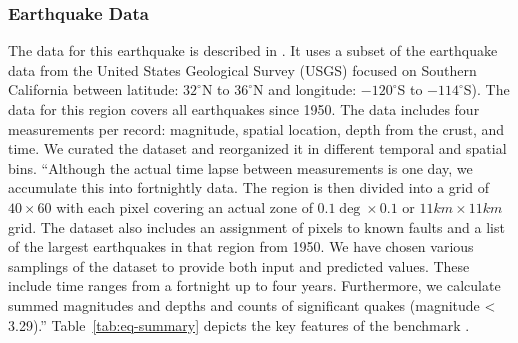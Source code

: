 \documentclass[utf8]{FrontiersinVancouver} %
\begin{document}
\subsubsection{Earthquake Data}

The data for this earthquake is described in
\citep{las-22-mlcommons-science}.  It uses a subset of the earthquake
data from the United States Geological Survey (USGS) focused on
Southern California between latitude: $32^\circ$N to $36^\circ$N and
longitude: $-120^\circ$S to $-114^\circ$S). The data for this region
covers all earthquakes since 1950. The data includes four measurements
per record: magnitude, spatial location, depth from the crust, and
time. We curated the dataset and reorganized it in different temporal
and spatial bins. ``Although the actual time lapse between
measurements is one day, we accumulate this into fortnightly data. The
region is then divided into a grid of $40\times 60$ with each pixel
covering an actual zone of $0.1\deg\times 0.1$ or $11km\times 11km$
grid. The dataset also includes an assignment of pixels to known
faults and a list of the largest earthquakes in that region from
1950. We have chosen various samplings of the dataset to provide both
input and predicted values. These include time ranges from a fortnight
up to four years. Furthermore, we calculate summed magnitudes and
depths and counts of significant quakes (magnitude < 3.29).''
Table~\ref{tab:eq-summary} depicts the key features of the benchmark
\citep{las-22-mlcommons-science}.
\end{document}

